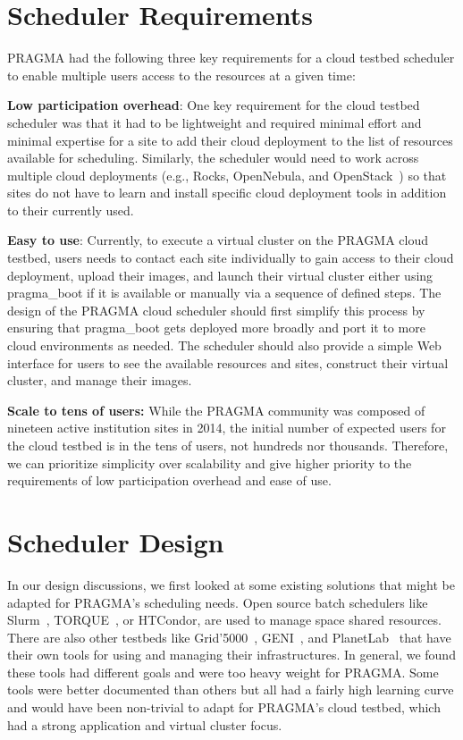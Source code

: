 \documentclass{acm_proc_article-sp}
\begin{document}
\section{Scheduler Requirements}

PRAGMA had the following three key requirements for a cloud testbed scheduler to enable multiple users access to the resources at a  given time:

\textbf{Low participation overhead}:  One key requirement for the cloud testbed scheduler was that it had to be lightweight and required  minimal effort and minimal expertise for a site to add their cloud deployment to the list of resources available for scheduling.   Similarly, the scheduler would need to work across multiple cloud deployments (e.g., Rocks, OpenNebula, and OpenStack~\cite{openstack}) so that sites do not have to learn and install specific cloud deployment tools in addition to their currently used.  

\textbf{Easy to use}:  Currently, to execute a virtual cluster on the PRAGMA cloud testbed, users needs to contact each site individually to gain access to their cloud deployment, upload their images, and launch their virtual cluster either using pragma\_boot  if it is available or manually via a sequence of defined steps.   The design of the PRAGMA cloud scheduler should first simplify this process by ensuring that pragma\_boot gets deployed more broadly and port it to more cloud environments as needed.   The scheduler should also provide a simple Web interface for users to see the available resources and sites, construct their virtual cluster, and manage their images.

\textbf{Scale to tens of users:}  While the PRAGMA community was composed of nineteen active institution sites in 2014, the initial number of expected users for the cloud testbed is in the tens of users, not hundreds nor thousands.  Therefore, we can prioritize simplicity over scalability and give higher priority to the requirements of low participation overhead and ease of use.

\section{Scheduler Design}
\label{Sec:Design}

In our design discussions, we first looked at some existing solutions that might be adapted for PRAGMA's scheduling needs.  Open source batch schedulers like Slurm~\cite{slurm}, TORQUE~\cite{torque}, or HTCondor, are used to manage space shared resources.  There are also other testbeds like Grid'5000~\cite{grid5000},  GENI~\cite{geni}, and PlanetLab~\cite{planetlab} that have their own tools for using and managing their infrastructures. In general, we found these tools had different goals and were too heavy weight for PRAGMA.  Some tools were better documented than others but all had a fairly high learning curve and would have been non-trivial to adapt for PRAGMA's cloud testbed, which had a strong application and virtual cluster focus.
\end{document}
